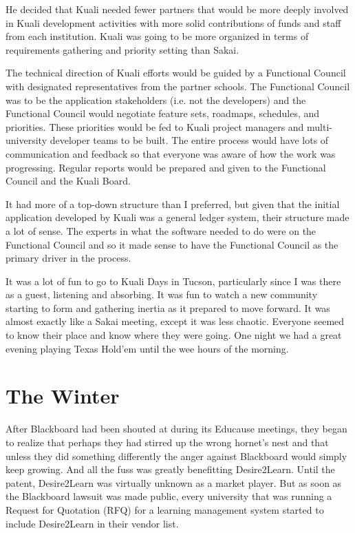\documentclass[12pt]{book}
\begin{document}
He decided that Kuali needed fewer partners that
would be more deeply
involved in Kuali development activities
with more solid contributions of funds and staff
from each institution.
Kuali was going to be more organized in terms of
requirements gathering and priority setting than Sakai.

The technical direction of Kuali efforts would be guided
by a Functional Council with designated
representatives from the partner schools.  The Functional Council
was to be the application stakeholders (i.e. not the developers)
and the Functional Council would negotiate feature sets, roadmaps,
schedules, and priorities.   These priorities would be fed
to Kuali project managers and multi-university developer teams
to be built.  The entire process would have lots of communication
and feedback so that everyone was aware of how the work
was progressing.  Regular reports would be prepared and given
to the Functional Council and the Kuali Board.

It had more of a top-down structure than I preferred, but given
that the initial application developed by Kuali
was a general ledger system, their structure made a lot
of sense.  The experts in what the
software needed to do were on the Functional Council and
so it made sense to have the Functional Council as the primary
driver in the process.

It was a lot of fun to go to Kuali Days in Tucson, particularly
since I was there as a guest, listening and absorbing.  It was
fun to watch a new community starting to form and gathering
inertia as it prepared to move forward.  It was almost exactly
like a Sakai meeting, except it was less chaotic.  Everyone seemed
to know their place and know where they were going.  One night
we had a great evening playing Texas Hold'em until the wee hours
of the morning.




\chapter{The Winter}

After Blackboard had been shouted at during its Educause
meetings, they began to realize that perhaps they had stirred
up the wrong hornet's nest and that unless they did something
differently the anger against Blackboard would simply keep
growing.  And all the fuss was greatly benefitting Desire2Learn.
Until the patent, Desire2Learn was virtually unknown as a market
player.  But as soon as the Blackboard lawsuit was made public,
every university that was running a Request for Quotation (RFQ)
for a learning management system started to include Desire2Learn
in their vendor list.
\end{document}
